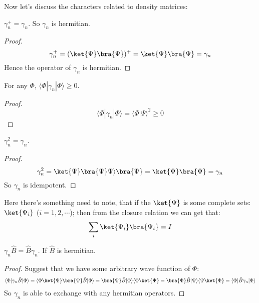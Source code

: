Now let's discuss the characters related to density matrices:
\begin{theorem}\label{}
$\gamma_{n}^{+} = \gamma_{n}$. So $\gamma_{n}$ is hermitian.
\end{theorem}

\begin{proof}
\begin{equation}\label{}
\gamma_{n}^{+} = (\ket{\Psi}\bra{\Psi})^{+} = \ket{\Psi}\bra{\Psi} =
\gamma_{n}
\end{equation}
Hence the operator of $\gamma_{n}$ is hermitian. \qedhere
\end{proof}

\begin{theorem}\label{}
For any $\Phi$, $\langle\Phi|\gamma_{n}|\Phi\rangle \geq 0$.
\end{theorem}

\begin{proof}
\begin{equation}\label{}
\langle\Phi|\gamma_{n}|\Phi\rangle = \langle\Phi|\Psi\rangle^{2}
\geq 0
\end{equation}
\qedhere
\end{proof}

\begin{theorem}\label{}
$\gamma_{n}^{2} = \gamma_{n}$.
\end{theorem}

\begin{proof}
\begin{equation}\label{}
\gamma_{n}^{2} = \ket{\Psi}\bra{\Psi}\Psi\rangle\bra{\Psi} =
\ket{\Psi}\bra{\Psi} = \gamma_{n}
\end{equation}
So $\gamma_{n}$ is idempotent. \qedhere
\end{proof}

Here there's something need to note, that if the $\ket{\Psi}$ is
some complete sets: $\ket{\Psi_{i}}$ ($i = 1, 2, \cdots$); then from
the closure relation we can get that:
\begin{equation}\label{}
\sum_{i}\ket{\Psi_{i}}\bra{\Psi_{i}} = I
\end{equation}

\begin{theorem}\label{}
$\gamma_{n}\hat{B} = \hat{B}\gamma_{n}$.
If $\hat{B}$ is hermitian.
\end{theorem}

\begin{proof}
Suggest that we have some arbitrary wave function of $\Phi$:
\begin{equation}\label{}
\langle\Phi|\gamma_{n}\hat{B}|\Phi\rangle =
\langle\Phi\ket{\Psi}\bra{\Psi}\hat{B}|\Phi\rangle =
\bra{\Psi}\hat{B}|\Phi\rangle\langle\Phi\ket{\Psi} =
\bra{\Phi}\hat{B}|\Psi\rangle\langle\Psi\ket{\Phi} =
\langle\Phi|\hat{B}\gamma_{n}|\Phi\rangle
\end{equation}
So $\gamma_{n}$ is able to exchange with any hermitian operators.
\qedhere
\end{proof}

